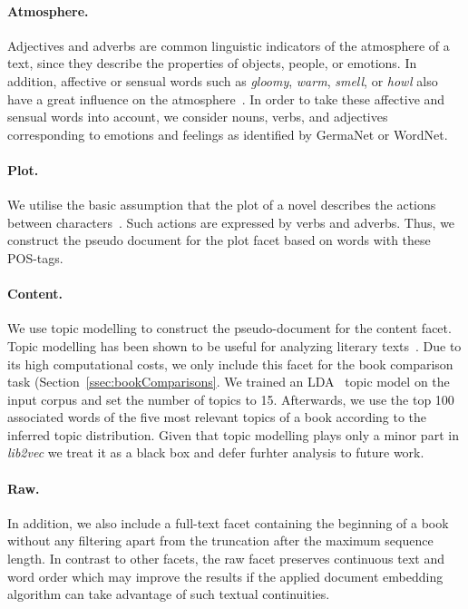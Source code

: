 \documentclass[11pt]{article}
\begin{document}
\paragraph{Atmosphere.}
Adjectives and adverbs are common linguistic indicators of the atmosphere of a text, since they describe the properties of objects, people, or emotions.
In addition, affective or sensual words such as \textit{gloomy}, \textit{warm}, \textit{smell}, or \textit{howl} also have a great influence on the atmosphere~\citep{tausczik_psychological_2010}.
In order to take these affective and sensual words into account, we consider nouns, verbs, and adjectives corresponding to emotions and feelings as identified by GermaNet or WordNet.

\paragraph{Plot.}
We utilise the basic assumption that the plot of a novel describes the actions between characters~\citep{labatut_extraction_2019, lee_story_2020}.
Such actions are expressed by verbs and adverbs.
Thus, we construct the pseudo document for the plot facet based on words with these POS-tags.

\paragraph{Content.}
We use topic modelling to construct the pseudo-document for the content facet.
Topic modelling has been shown to be useful for analyzing literary texts~\citep{uglanova_2020}.
Due to its high computational costs, we only include this facet for the book comparison task (Section~\ref{ssec:bookComparisons}.
We trained an LDA~\citep{blei2003latent} topic model on the input corpus and set the number of topics to 15.
Afterwards, we use the top 100 associated words of the five most relevant topics of a book according to the inferred topic distribution.
Given that topic modelling plays only a minor part in \emph{lib2vec} we treat it as a black box and defer furhter analysis to future work.

\paragraph{Raw.}
In addition, we also include a full-text facet containing the beginning of a book without any filtering apart from the truncation after the maximum sequence length.
In contrast to other facets, the raw facet preserves continuous text and word order which may improve the results if the applied document embedding algorithm can take advantage of such textual continuities.
\end{document}
